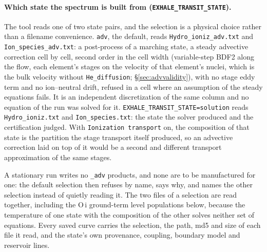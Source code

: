\documentclass[english,a4paper]{my_memo}
\begin{document}
\paragraph{Which state the spectrum is built from
(\texttt{EXHALE\_TRANSIT\_STATE}).}
The tool reads one of two state pairs, and the selection is a physical choice
rather than a filename convenience.  \texttt{adv}, the default, reads
\texttt{Hydro\_ioniz\_adv.txt} and \texttt{Ion\_species\_adv.txt}: a
post-process of a marching state, a steady advective correction cell by cell,
second order in the cell width (variable-step BDF2 along the flow, each
element's stages on the velocity of that element's nuclei, which is the bulk
velocity without \texttt{He\_diffusion}; \S\ref{sec:advvalidity}), with no
stage eddy term and no ion--neutral drift, refused in a cell where an
assumption of the steady equations fails.
It is an independent discretization of the same column and no equation of the
run was solved for it.  \texttt{EXHALE\_TRANSIT\_STATE=solution} reads
\texttt{Hydro\_ioniz.txt} and \texttt{Ion\_species.txt}: the state the
solver produced and the certification judged.  With \texttt{Ionization
transport} on, the composition of that state is the partition the stage
transport itself produced, so an advective correction laid on top of it would
be a second and different transport approximation of the same stages.

A stationary run writes no \texttt{\_adv} products, and none are to be
manufactured for one: the default selection then refuses by name, says why,
and names the other selection instead of quietly reading it.  The two files
of a selection are read together, including the O\,{\sc i} ground-term level
populations below, because the temperature of one state with the composition
of the other solves neither set of equations.  Every saved curve carries the
selection, the path, md5 and size of each file it read, and the state's own
provenance, coupling, boundary model and reservoir lines.
\end{document}

